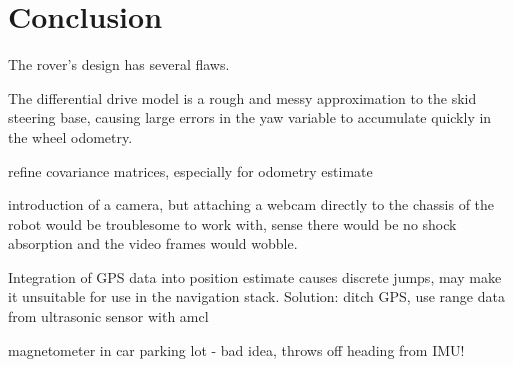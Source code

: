 \chapter*{Conclusion}

The rover's design has several flaws.

The differential drive model is a rough and messy approximation to the skid steering base, causing large errors in the yaw variable to accumulate quickly in the wheel odometry.

refine covariance matrices, especially for odometry estimate

introduction of a camera, but attaching a webcam directly to the chassis of the robot would be troublesome to work with, sense there would be no shock absorption and the video frames would wobble.

Integration of GPS data into position estimate causes discrete jumps, may make it unsuitable for use in the navigation stack. Solution: ditch GPS, use range data from ultrasonic sensor with amcl

magnetometer in car parking lot - bad idea, throws off heading from IMU!



